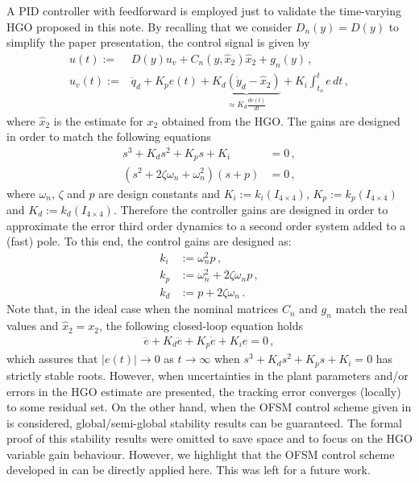 \documentclass[letterpaper, 10 pt, conference]{ieeeconf}  %
\theoremstyle{plain}
\theoremstyle{definition}
\theoremstyle{remark}
\begin{document}
A  PID controller with feedforward is employed just to validate the time-varying HGO proposed in this note. By recalling that we  consider $D_n(y)=D(y)$ to simplify the paper presentation, the control  signal is given by
%
\begin{align}
u(t) := & D(y) u_v + C_{n}(y,\hat{x}_2) \hat{x}_2+g_{n}(y)\,, \\
u_v(t):= &\ddot{q}_d + K_p e(t) + \underbrace{K_d (\dot{y}_d - \hat{x}_2)}_{\approx K_d \frac{de(t)}{dt}} + K_i\int_{t_o}^{t}e \, dt\,,
\label{eq:defu}
\end{align}
%
where $\hat{x}_2$ is the estimate for $x_2$ obtained from the HGO. The gains are designed in order to match the following equations
%
\begin{align}
	s^3 + K_ds^2 + K_ps + K_i &= 0\,, \\
	(s^2 + 2\zeta \omega_n + \omega_n^2)(s + p) &= 0\,,
\end{align}
%
where $\omega_n$, $\zeta$ and $p$ are design constants and $K_i := k_i(I_{4 \times 4})$, $K_p := k_p(I_{4 \times 4})$ and $K_d := k_d(I_{4 \times 4})$. Therefore the controller gains are designed in order to approximate the error third order dynamics to a second order system added to a (fast) pole. To this end, the control gains are designed as:
%
\begin{align}
	k_i &:= \omega_n^2p\,, \\
	k_p &:= \omega_n^2 + 2\zeta \omega_n p\,, \\
	k_d &:= p + 2\zeta \omega_n\,. 
\end{align}
%
Note that, in the ideal case when the nominal matrices $C_n$ and $g_n$ match the real values and $\hat{x}_2=x_2$, the following closed-loop equation holds
%
\begin{align}
\dddot{e} + K_d \ddot{e} + K_p \dot{e} + K_i e =0\,,
\label{eq:closed}
\end{align}
%
which assures that $|e(t)| \rightarrow 0$ as $t \rightarrow \infty$ when  $s^3 + K_d s^2 + K_p s + K_i = 0$ has strictly stable roots. However, when uncertainties in the plant parameters and/or errors in the HGO estimate are presented, the tracking error converges (locally) to some residual set. On the other hand, when the OFSM control scheme given in \cite{POH:2011} is considered, global/semi-global stability results can be guaranteed. The formal proof of this stability results were omitted to save space and to focus on the HGO variable gain behaviour. However, we highlight that  the OFSM control scheme developed in \cite{POH:2011} can be directly applied here. This was left for a future work. 
\end{document}
